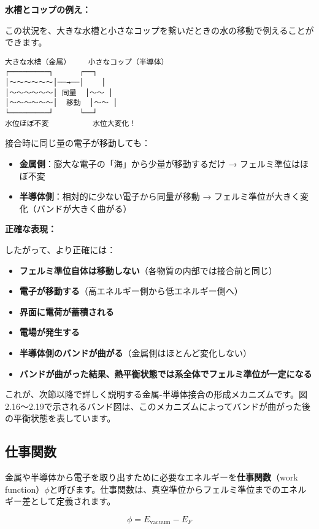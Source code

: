 \textbf{水槽とコップの例え：}

この状況を、大きな水槽と小さなコップを繋いだときの水の移動で例えることができます。

\begin{verbatim}
大きな水槽（金属）    小さなコップ（半導体）
┌─────────┐      ┌──┐
│～～～～～～│──→──│    │
│～～～～～～│ 同量  │～～ │
│～～～～～～│  移動  │～～ │
└─────────┘      └──┘
水位ほぼ不変          水位大変化！
\end{verbatim}

接合時に同じ量の電子が移動しても：
\begin{itemize}
\item \textbf{金属側}：膨大な電子の「海」から少量が移動するだけ → フェルミ準位はほぼ不変
\item \textbf{半導体側}：相対的に少ない電子から同量が移動 → フェルミ準位が大きく変化（バンドが大きく曲がる）
\end{itemize}

\textbf{正確な表現：}

したがって、より正確には：
\begin{itemize}
\item \textbf{フェルミ準位自体は移動しない}（各物質の内部では接合前と同じ）
\item \textbf{電子が移動する}（高エネルギー側から低エネルギー側へ）
\item \textbf{界面に電荷が蓄積される}
\item \textbf{電場が発生する}
\item \textbf{半導体側のバンドが曲がる}（金属側はほとんど変化しない）
\item \textbf{バンドが曲がった結果、熱平衡状態では系全体でフェルミ準位が一定になる}
\end{itemize}

これが、次節以降で詳しく説明する金属-半導体接合の形成メカニズムです。図2.16〜2.19で示されるバンド図は、このメカニズムによってバンドが曲がった後の平衡状態を表しています。

\subsection{仕事関数}

金属や半導体から電子を取り出すために必要なエネルギーを\textbf{仕事関数}（work function）$\phi$と呼びます。仕事関数は、真空準位からフェルミ準位までのエネルギー差として定義されます。

\begin{equation}
\phi = E_{\text{vacuum}} - E_F
\end{equation}

